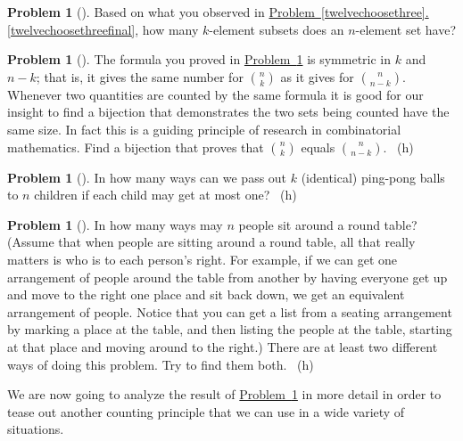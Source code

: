 \documentclass[10pt,]{book}
\theoremstyle{plain}
\theoremstyle{definition}
\newtheorem{activity}[project]{Problem}
\theoremstyle{definition}
\numberwithin{equation}{chapter}
\newcommand{\importantarrow}{\Rightarrow}
\begin{document}
\begin{activity}[] \label{nchoosek}
\hypertarget{p-208}{}%
Based on what you observed in \hyperref[twelvechoosethreefinal]{Problem~\ref{twelvechoosethree}.\ref{twelvechoosethreefinal}}, how many \(k\)-element subsets does an \(n\)-element set have?%
\end{activity}
\begin{activity}[]\marginsymbol[-1em]{\pdftooltip{$\importantarrow$}{especially interesting}} \label{activity-36}
\hypertarget{p-210}{}%
The formula you proved in \hyperref[nchoosek]{Problem~\ref{nchoosek}} is symmetric in \(k\) and \(n-k\); that is, it gives the same number for \(\binom{n}{k}\) as it gives for \(\binom{n}{n-k}\). Whenever two quantities are counted by the same formula it is good for our insight to find a bijection that demonstrates the two sets being counted have the same size. In fact this is a guiding principle of research in combinatorial mathematics. Find a bijection that proves that \(\binom{n}{k}\) equals \(\binom{n}{n-k}\).%
~{\tiny (h)}\end{activity}
\begin{activity}[] \label{ping-pong}
\hypertarget{p-213}{}%
In how many ways can we pass out \(k\) (identical) ping-pong balls to \(n\) children if each child may get at most one?%
~{\tiny (h)}\end{activity}
\begin{activity}[] \label{roundtable}
\hypertarget{p-216}{}%
In how many ways may \(n\) people sit around a round table? (Assume that when people are sitting around a round table, all that really matters is who is to each person's right. For example, if we can get one arrangement of people around the table from another by having everyone get up and move to the right one place and sit back down, we get an equivalent arrangement of people. Notice that you can get a list from a seating arrangement by marking a place at the table, and then listing the people at the table, starting at that place and moving around to the right.) There are at least two different ways of doing this problem. Try to find them both.%
~{\tiny (h)}\end{activity}
\hypertarget{p-220}{}%
We are now going to analyze the result of \hyperref[nchoosek]{Problem~\ref{nchoosek}} in more detail in order to tease out another counting principle that we can use in a wide variety of situations.%
\end{document}
